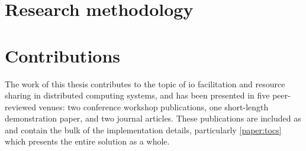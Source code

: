 \section{Research methodology}



\section{Contributions}
The work of this thesis contributes to the topic of \gls{io} facilitation and resource sharing in distributed computing systems, and has been presented in five peer-reviewed venues: two conference workshop publications, one short-length demonstration paper, and two journal articles.
These publications are included as  and contain the bulk of the implementation details, particularly \cref{paper:tocs} which presents the entire solution as a whole.

